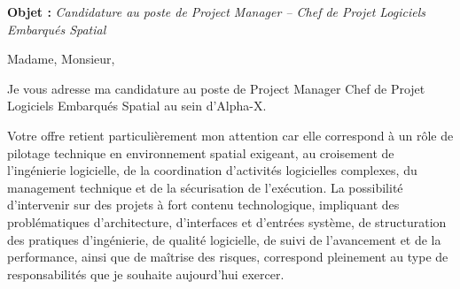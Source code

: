 \documentclass[11pt,a4paper]{altacv}
\begin{document}
\makecvheader
\vspace{-0.5cm}
\vspace{-0.3cm}

{\color{accent}\textbf{Objet :}} \textit{Candidature au poste de Project Manager -- Chef de Projet Logiciels Embarqués Spatial}

{\color{body}

Madame, Monsieur,

Je vous adresse ma candidature au poste de Project Manager Chef de Projet Logiciels Embarqués Spatial au sein d'Alpha-X.

Votre offre retient particulièrement mon attention car elle correspond à un rôle de pilotage technique en environnement spatial exigeant, au croisement de l'ingénierie logicielle, de la coordination d'activités logicielles complexes, du management technique et de la sécurisation de l'exécution. La possibilité d'intervenir sur des projets à fort contenu technologique, impliquant des problématiques d'architecture, d'interfaces et d'entrées système, de structuration des pratiques d'ingénierie, de qualité logicielle, de suivi de l'avancement et de la performance, ainsi que de maîtrise des risques, correspond pleinement au type de responsabilités que je souhaite aujourd'hui exercer.

}
\end{document}
